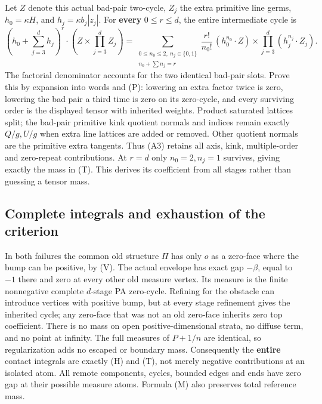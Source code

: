 \documentclass[
  11pt,
]{article}
\begin{document}
Let \(Z\) denote this actual bad-pair two-cycle, \(Z_j\) the extra
primitive line germs, \(h_0=\kappa H\), and \(h_j=\kappa b_j|z_j|\). For
\textbf{every} \(0\leq r\leq d\), the entire intermediate cycle is \[
 (h_0+\sum_{j=3}^dh_j)^r\cdot(Z\times\prod_{j=3}^dZ_j)
 =\sum_{\substack{0\leq n_0\leq2,\ n_j\in\{0,1\}\\n_0+\sum n_j=r}}
       \frac{r!}{n_0!}\,(h_0^{n_0}\cdot Z)
                              \times\prod_{j=3}^d(h_j^{n_j}\cdot Z_j).
 \tag{A3}
\] The factorial denominator accounts for the two identical bad-pair
slots. Prove this by expansion into words and (P): lowering an extra
factor twice is zero, lowering the bad pair a third time is zero on its
zero-cycle, and every surviving order is the displayed tensor with
inherited weights. Product saturated lattices split; the bad-pair
primitive kink quotient normals and indices remain exactly \(Q/g,U/g\)
when extra line lattices are added or removed. Other quotient normals
are the primitive extra tangents. Thus (A3) retains all axis, kink,
multiple-order and zero-repeat contributions. At \(r=d\) only
\(n_0=2,n_j=1\) survives, giving exactly the mass in (T). This derives
its coefficient from all stages rather than guessing a tensor mass.

\subsection{Complete integrals and exhaustion of the
criterion}\label{complete-integrals-and-exhaustion-of-the-criterion}

In both failures the common old structure \(\Pi\) has only \(o\) as a
zero-face where the bump can be positive, by (V). The actual envelope
has exact gap \(-\beta\), equal to \(-1\) there and zero at every other
old measure vertex. Its measure is the finite nonnegative complete
\(d\)-stage PA zero-cycle. Refining for the obstacle can introduce
vertices with positive bump, but at every stage refinement gives the
inherited cycle; any zero-face that was not an old zero-face inherits
zero top coefficient. There is no mass on open positive-dimensional
strata, no diffuse term, and no point at infinity. The full measures of
\(P+1/n\) are identical, so regularization adds no escaped or boundary
mass. Consequently the \textbf{entire} contact integrals are exactly (H)
and (T), not merely negative contributions at an isolated atom. All
remote components, cycles, bounded edges and ends have zero gap at their
possible measure atoms. Formula (M) also preserves total reference mass.
\end{document}
